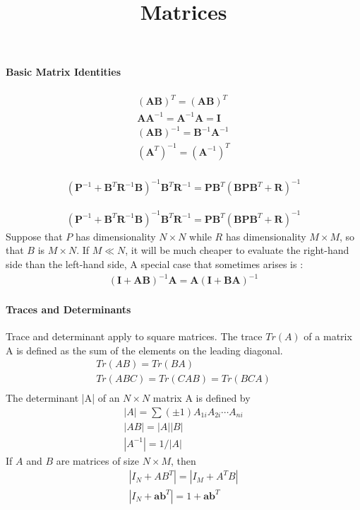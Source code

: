 \documentclass[a4paper]{article}
\begin{document}
\title{Matrices}
\author{}
\maketitle

\paragraph{Basic Matrix Identities}
\begin{align}
(\mathbf{A}\mathbf{B})^T = (\mathbf{A}\mathbf{B})^T\\
\mathbf{A}\mathbf{A}^{-1} = \mathbf{A}^{-1}\mathbf{A} = \mathbf{I}\\
(\mathbf{A}\mathbf{B})^{-1} = \mathbf{B}^{-1} \mathbf{A}^{-1}\\
(\mathbf{A}^T)^{-1} = (\mathbf{A}^{-1})^T\\
\end{align}

\begin{align}
(\mathbf{P}^{-1} +
  \mathbf{B}^T\mathbf{R}^{-1}\mathbf{B})^{-1}\mathbf{B}^T\mathbf{R}^{-1}
  =\mathbf{P}\mathbf{B}^T(\mathbf{B}\mathbf{P}\mathbf{B}^T+\mathbf{R})^{-1}
\end{align}

\begin{align}
(\mathbf{P}^{-1} +
  \mathbf{B}^T\mathbf{R}^{-1}\mathbf{B})^{-1}\mathbf{B}^T\mathbf{R}^{-1}
  =\mathbf{P}\mathbf{B}^T(\mathbf{B}\mathbf{P}\mathbf{B}^T+\mathbf{R})^{-1}
\end{align}
Suppose that $P$ has dimensionality $N \times N$ while $R$ has
dimensionality $M \times M$, so that $B$ is $M \times N$. If $M \ll
N$, it will be much cheaper to evaluate the right-hand side than the
left-hand side, A special case that sometimes arises is :
\begin{align}
(\mathbf{I} + \mathbf{AB})^{-1}\mathbf{A} = \mathbf{A}(\mathbf{I}+\mathbf{B}\mathbf{A})^{-1}
\end{align}

\paragraph{Traces and Determinants}
Trace and determinant apply to square matrices. The trace $Tr(A)$ of a
matrix A is defined as the sum of the elements on the leading diagonal.
\begin{align}
Tr(AB) = Tr(BA)\\
Tr(ABC) = Tr(CAB) = Tr(BCA)\\
\end{align}
The determinant |A| of an $N \times N$ matrix A is defined by
\begin{align}
|A| = \sum (\pm 1)A_{1i}A_{2i} \cdots A_{ni}\\
|AB| = |A||B|\\
|A^{-1}| = 1/|A|
\end{align}
If $A$ and $B$ are matrices of size $N \times M$, then
\begin{align}
|I_N+AB^T| = |I_M+A^TB|\\
|I_N+\mathbf{a}\mathbf{b}^T| = 1+\mathbf{a}\mathbf{b}^T
\end{align}
\end{document}
